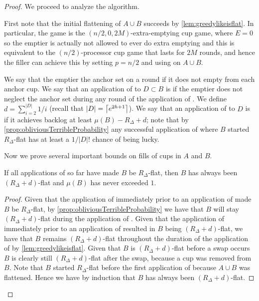 \begin{proof}
We proceed to analyze the algorithm.

First note that the initial flattening of $A\cup B$ succeeds by
\cref{lem:greedylikeisflat}. In particular, the game is the 
$(n/2, 0, 2M)$-extra-emptying cup game, where $E=0$ so the
emptier is actually not allowed to ever do extra emptying and
this is equivalent to the $(n/2)$-processor cup game that lasts
for $2M$ rounds, and hence the filler can achieve this by setting
$p=n/2$ and using \flatalg on $A\cup B$.

We say that the emptier  the anchor set on a round
if it does not empty from each anchor cup. We say that an
application of \randalg to $D\subset B$ is  if
the emptier does not neglect the anchor set during any round of
the application of \randalg. We define $d = \sum_{i=2}^{|D|} 1/i$ (recall
that $|D| = \left\lceil e^{2h+1} \right\rceil$). We say that an application of
\randalg to $D$ is  if it achieves backlog at
least $\mu(B) - R_\Delta + d$; note that by 
\cref{prop:obliviousTerribleProbability} any successful
application of \randalg where $B$ started $R_\Delta$-flat has
at least a $1/|D|!$ chance of being lucky. 



Now we prove several important bounds on fills of cups in $A$ and $B$.
\begin{clm}
  \label{clm:oblivBaseIntenseInduction1}
  If all applications of \flatalg so far have made
  $B$ be $R_\Delta$-flat, then $B$ has always been $(R_\Delta +
  d)$-flat and $\mu(B)$ has never exceeded $1$.
\end{clm}
\begin{proof}
  Given that the application of \flatalg immediately prior to an application
  of \randalg made $B$ be $R_\Delta$-flat, by
  \cref{prop:obliviousTerribleProbability} we have that $B$ will
  stay $(R_\Delta + d)$-flat during the application of \randalg. 
  Given that the application of \randalg immediately prior to an
  application of \flatalg resulted in $B$ being $(R_\Delta
  + d)$-flat, we have that $B$ remains $(R_\Delta + d)$-flat
  throughout the duration of the application of \flatalg by
  \cref{lem:greedylikeisflat}. Given that $B$ is $(R_\Delta +
  d)$-flat before a swap occurs $B$ is clearly still $(R_\Delta +
  d)$-flat after the swap, because a cup was removed from $B$.
  Note that $B$ started $R_\Delta$-flat before the first
  application of \flatalg because $A\cup B$ was flattened.
  Hence we have by induction that $B$ has always been $(R_\Delta
  + d)$-flat. 


\end{proof}
\end{proof}
